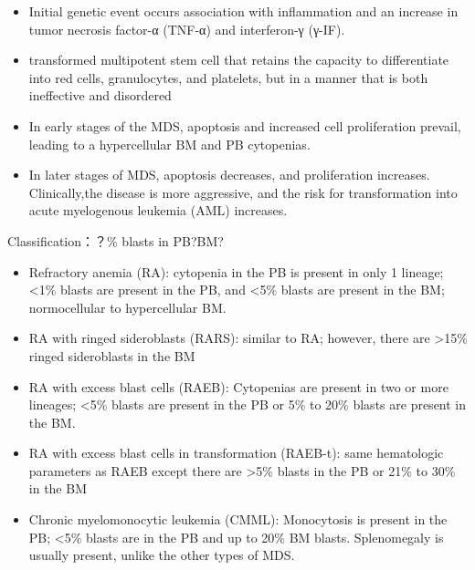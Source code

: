 \documentclass[
  ignorenonframetext,
]{beamer}
\begin{document}
\begin{frame}
\begin{itemize}
\item
  Initial genetic event occurs association with inflammation and an
  increase in tumor necrosis factor-α (TNF-α) and interferon-γ (γ-IF).
\item
  transformed multipotent stem cell that retains the capacity to
  differentiate into red cells, granulocytes, and platelets, but in a
  manner that is both ineffective and disordered
\item
  In early stages of the MDS, apoptosis and increased cell proliferation
  prevail, leading to a hypercellular BM and PB cytopenias.
\item
  In later stages of MDS, apoptosis decreases, and proliferation
  increases. Clinically,the disease is more aggressive, and the risk for
  transformation into acute myelogenous leukemia (AML) increases.
\end{itemize}
\end{frame}

\begin{frame}
\begin{block}{Classification：？\% blasts in PB?BM?}
\protect\hypertarget{classification-blasts-in-pbbm}{}
\begin{itemize}
\item
  Refractory anemia (RA): cytopenia in the PB is present in only 1
  lineage; \textless1\% blasts are present in the PB, and \textless5\%
  blasts are present in the BM; normocellular to hypercellular BM.
\item
  RA with ringed sideroblasts (RARS): similar to RA; however, there are
  \textgreater15\% ringed sideroblasts in the BM
\item
  RA with excess blast cells (RAEB): Cytopenias are present in two or
  more lineages; \textless5\% blasts are present in the PB or 5\% to
  20\% blasts are present in the BM.
\item
  RA with excess blast cells in transformation (RAEB-t): same
  hematologic parameters as RAEB except there are \textgreater5\% blasts
  in the PB or 21\% to 30\% in the BM
\item
  Chronic myelomonocytic leukemia (CMML): Monocytosis is present in the
  PB; \textless5\% blasts are in the PB and up to 20\% BM blasts.
  Splenomegaly is usually present, unlike the other types of MDS.
\end{itemize}
\end{block}
\end{frame}
\end{document}

